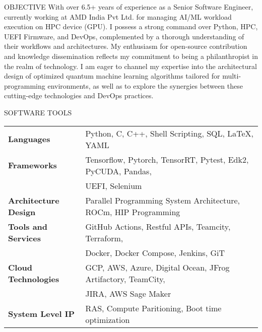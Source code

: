 \documentclass{resume} %
\begin{document}

\begin{rSection}{OBJECTIVE}
{With over 6.5+ years of experience as a Senior Software Engineer, currently working at AMD India Pvt Ltd. for managing AI/ML workload execution on HPC device (GPU). I possess a strong command over Python, HPC, UEFI Firmware, and DevOps, complemented by a thorough understanding of their workflows and architectures. My enthusiasm for open-source contribution and knowledge dissemination reflects my commitment to being a philanthropist in the realm of technology. I am eager to channel my expertise into the architectural design of optimized quantum machine learning algorithms tailored for multi-programming environments, as well as to explore the synergies between these cutting-edge technologies and DevOps practices.}

\end{rSection}





\begin{rSection}{SOFTWARE TOOLS}

\begin{tabular}{ @{} >{\bfseries}l @{\hspace{6ex}} l }

Languages & Python, C, C++, Shell Scripting, SQL, LaTeX, YAML 
\\
Frameworks & Tensorflow, Pytorch, TensorRT, Pytest, Edk2, PyCUDA, Pandas, 
\\ & UEFI, Selenium 
\\
Architecture Design & Parallel Programming System Architecture, ROCm, HIP Programming
\\
Tools and Services & GitHub Actions, Restful APIs, Teamcity, Terraform,
\\ & Docker, Docker Compose, Jenkins, GiT 
\\
Cloud Technologies & GCP, AWS, Azure, Digital Ocean, JFrog Artifactory, TeamCity, 
\\ & JIRA, AWS Sage Maker
\\
System Level IP & RAS, Compute Paritioning, Boot time optimization

\end{tabular}

\end{rSection}
\end{document}
